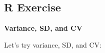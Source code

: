 \documentclass[
]{book}
\begin{document}
\begin{longtable}[]{@{}
  >{\raggedright\arraybackslash}p{}
  >{\raggedright\arraybackslash}p{}@{}}
                                                                                                                                                                                                                                                                                                                                                                                                                                                                                                                                                                                                                                                                                                                                                                                                                                                                                                                                                                                                                                                                                                                                                                                                                                                                                                                                                                                                                                                                                                                                                                                                                                                                                                                                                                                                                                                                                                                                          \) \\
\bottomrule()
\end{longtable}

\hypertarget{r-exercise-1}{%
\subsection{R Exercise}\label{r-exercise-1}}

\textbf{Variance, SD, and CV}

Let's try variance, SD, and CV:
\end{document}
